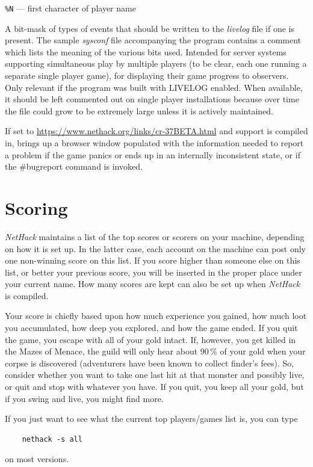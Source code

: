 \documentclass[titlepage]{article}
\begin{document}
\begin{description}[font=\mdseries\itshape]
\texttt{\%N}  --- first character of player name
\item[LIVELOG]
A bit-mask of types of events that should be written to
the \textit{livelog} file if one is present.
The sample \textit{sysconf} file accompanying the program contains a
comment which lists the meaning of the various bits used.
Intended for server systems supporting simultaneous play by multiple
players (to be clear, each one running a separate single player game),
for displaying their game progress to observers.
Only relevant if the program was built with LIVELOG enabled.
When available, it should be left commented out on single player
installations because over time the file could grow to be extremely
large unless it is actively maintained.
\item[CRASHREPORTURL]
If set to
\url{https://www.nethack.org/links/cr-37BETA.html}
and support is compiled in, brings up a browser window populated with
the information needed to report a problem if the game panics or ends
up in an internally inconsistent state, or if the \#bugreport command is
invoked.
\end{description}

\section{Scoring}

\textit{NetHack} maintains a list of the top scores or scorers on your machine,
depending on how it is set up.  In the latter case, each account on
the machine can post only one non-winning score on this list.  If
you score higher than someone else on this list, or better your
previous score, you will be inserted in the proper place under your
current name.  How many scores are kept can also be set up when
\textit{NetHack} is compiled.

Your score is chiefly based upon how much experience you gained, how
much loot you accumulated, how deep you explored, and how the game
ended.  If you quit the game, you escape with all of your gold intact.
If, however, you get killed in the Mazes of Menace, the guild will
only hear about 90\,\% of your gold when your corpse is discovered
(adventurers have been known to collect finder's fees).  So, consider
whether you want to take one last hit at that monster and possibly
live, or quit and stop with whatever you have.  If you quit, you keep
all your gold, but if you swing and live, you might find more.

If you just want to see what the current top players/games list is, you
can type
\begin{verbatim}
    nethack -s all
\end{verbatim}
on most versions.
\end{document}
